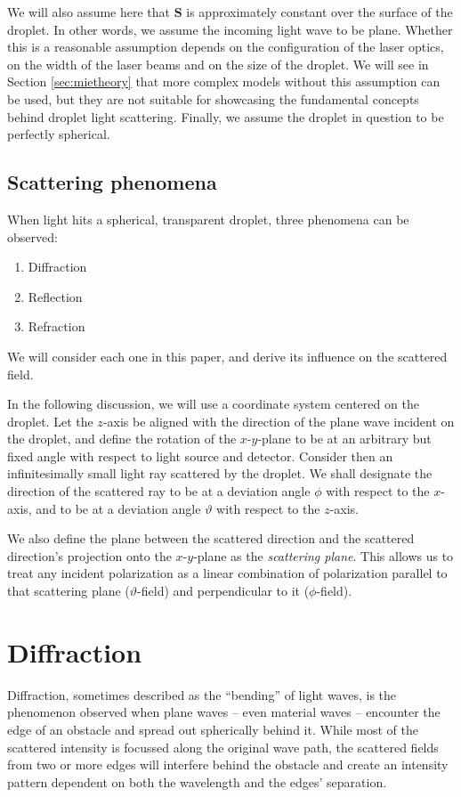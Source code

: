 \documentclass[11.5pt]{book}
\begin{document}
We will also assume here that $\mathbf{S}$ is approximately constant over the
surface of the droplet. In other words, we assume the incoming light wave to be
plane. Whether this is a reasonable assumption depends on the configuration of
the laser optics, on the width of the laser beams and on the size of the
droplet. We will see in Section \ref{sec:mietheory} that more complex models
without this assumption can be used, but they are not suitable for showcasing
the fundamental concepts behind droplet light scattering.  Finally, we assume
the droplet in question to be perfectly spherical.

\subsection{Scattering phenomena}

When light hits a spherical, transparent droplet, three phenomena can be
observed:
\begin{enumerate}
    \item Diffraction
    \item Reflection
    \item Refraction
\end{enumerate}
We will consider each one in this paper, and derive its influence on the
scattered field.

In the following discussion, we will use a coordinate system centered on the
droplet. Let the $z$-axis be aligned with the direction of the plane wave
incident on the droplet, and define the rotation of the $x$-$y$-plane to be at an
arbitrary but fixed angle with respect to light source and detector. Consider
then an infinitesimally small light ray scattered by the droplet. We shall
designate the direction of the scattered ray to be at a deviation angle $\phi$ with
respect to the $x$-axis, and to be at a deviation angle $\vartheta$ with respect
to the $z$-axis.

We also define the plane between the scattered direction and the scattered
direction's projection onto the $x$-$y$-plane as the \emph{scattering plane}. This
allows us to treat any incident polarization as a linear combination of
polarization parallel to that scattering plane ($\vartheta$-field) and
perpendicular to it ($\phi$-field). 

\section{Diffraction} Diffraction, sometimes described as the ``bending'' of
light waves, is the phenomenon observed when plane waves -- even material waves
-- encounter the edge of an obstacle and spread out spherically behind it. While
most of the scattered intensity is focussed along the original wave path, the
scattered fields from two or more edges will interfere behind the obstacle and
create an intensity pattern dependent on both the wavelength and the edges'
separation.
\end{document}
